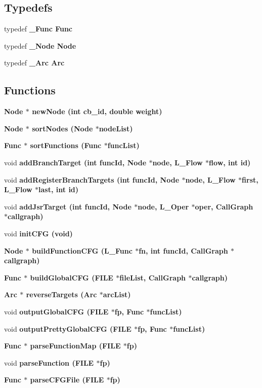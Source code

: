 \subsection*{Typedefs}
\begin{CompactItemize}
\item 
typedef \bf{\_\-Func} \bf{Func}
\item 
typedef \bf{\_\-Node} \bf{Node}
\item 
typedef \bf{\_\-Arc} \bf{Arc}
\end{CompactItemize}
\subsection*{Functions}
\begin{CompactItemize}
\item 
\bf{Node} $\ast$ \bf{new\-Node} (int cb\_\-id, double weight)
\item 
\bf{Node} $\ast$ \bf{sort\-Nodes} (\bf{Node} $\ast$node\-List)
\item 
\bf{Func} $\ast$ \bf{sort\-Functions} (\bf{Func} $\ast$func\-List)
\item 
void \bf{add\-Branch\-Target} (int func\-Id, \bf{Node} $\ast$\bf{node}, L\_\-Flow $\ast$flow, int id)
\item 
void \bf{add\-Register\-Branch\-Targets} (int func\-Id, \bf{Node} $\ast$\bf{node}, L\_\-Flow $\ast$first, L\_\-Flow $\ast$last, int id)
\item 
void \bf{add\-Jsr\-Target} (int func\-Id, \bf{Node} $\ast$\bf{node}, L\_\-Oper $\ast$oper, Call\-Graph $\ast$callgraph)
\item 
void \bf{init\-CFG} (void)
\item 
\bf{Node} $\ast$ \bf{build\-Function\-CFG} (L\_\-Func $\ast$fn, int func\-Id, Call\-Graph $\ast$callgraph)
\item 
\bf{Func} $\ast$ \bf{build\-Global\-CFG} (FILE $\ast$file\-List, Call\-Graph $\ast$callgraph)
\item 
\bf{Arc} $\ast$ \bf{reverse\-Targets} (\bf{Arc} $\ast$arc\-List)
\item 
void \bf{output\-Global\-CFG} (FILE $\ast$fp, \bf{Func} $\ast$func\-List)
\item 
void \bf{output\-Pretty\-Global\-CFG} (FILE $\ast$fp, \bf{Func} $\ast$func\-List)
\item 
\bf{Func} $\ast$ \bf{parse\-Function\-Map} (FILE $\ast$fp)
\item 
void \bf{parse\-Function} (FILE $\ast$fp)
\item 
\bf{Func} $\ast$ \bf{parse\-CFGFile} (FILE $\ast$fp)
\end{CompactItemize}
